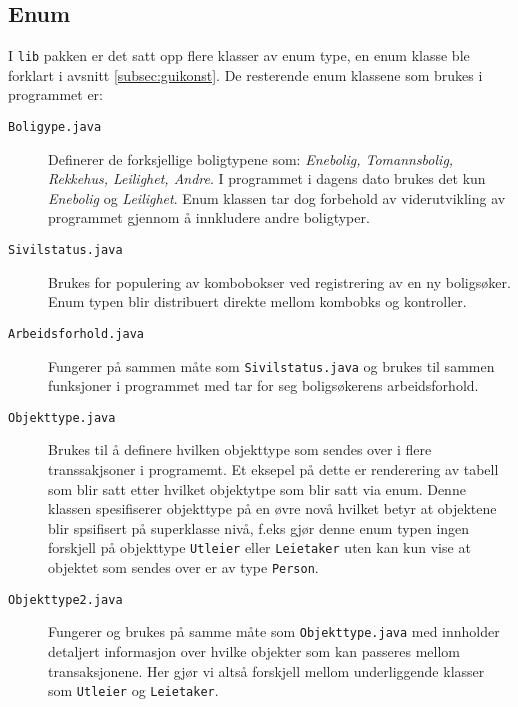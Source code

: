 \subsection{Enum}
I \texttt{lib} pakken er det satt opp flere klasser av enum type, en enum klasse ble forklart i avsnitt \ref{subsec:guikonst}. De resterende enum klassene som brukes i programmet er:
\begin{description}
\item[\texttt{Boligype.java}]
Definerer de forksjellige boligtypene som: \textit{Enebolig, Tomannsbolig, Rekkehus, Leilighet, Andre}. I programmet i dagens dato brukes det kun \textit{Enebolig} og \textit{Leilighet}. Enum klassen tar dog forbehold av viderutvikling av programmet gjennom å innkludere andre boligtyper.
\item[\texttt{Sivilstatus.java}]
Brukes for populering av kombobokser ved registrering av en ny boligsøker. Enum typen blir distribuert direkte mellom kombobks og kontroller.
\item[\texttt{Arbeidsforhold.java}]
Fungerer på sammen måte som \texttt{Sivilstatus.java} og brukes til sammen funksjoner i programmet med tar for seg boligsøkerens arbeidsforhold.
\item[\texttt{Objekttype.java}]
Brukes til å definere hvilken objekttype som sendes over i flere transsakjsoner i programemt. Et eksepel på dette er renderering av tabell som blir satt etter hvilket objektytpe som blir satt via enum. Denne klassen spesifiserer objekttype på en øvre novå hvilket betyr at objektene blir spsifisert på superklasse nivå, f.eks gjør denne enum typen ingen forskjell på objekttype \texttt{Utleier} eller \texttt{Leietaker} uten kan kun vise at objektet som sendes over er av type \texttt{Person}.
\item[\texttt{Objekttype2.java}]
Fungerer og brukes på samme måte som \texttt{Objekttype.java} med innholder detaljert informasjon over hvilke objekter som kan passeres mellom transaksjonene. Her gjør vi altså forskjell mellom underliggende klasser som \texttt{Utleier} og \texttt{Leietaker}.

\end{description}